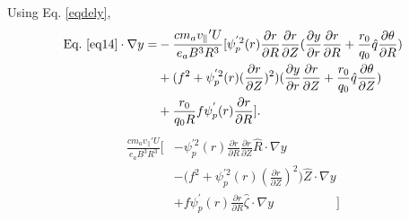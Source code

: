 \documentclass[12pt]{article}
\begin{document}
\begin{CJK*}{UTF8}{gbsn}
Using Eq. \ref{eqdely},
\begin{equation}
\begin{split}
    \textrm{Eq.}\ \ref{eq14} \cdot\nabla y =& -\frac{cm_av_{\parallel}{'}U}{e_aB^3R^3}[\psi_p^{'2}(r)\frac{\partial r}{\partial R}\frac{\partial r}{\partial Z}
    (\frac{\partial y}{\partial r}\frac{\partial r}{\partial R} + \frac{r_0}{q_0}\hat{q}\frac{\partial \theta}{\partial R})\\
    &+ (f^2 + \psi_p^{'2}(r)(\frac{\partial r}{\partial Z})^2)(\frac{\partial y}{\partial r}\frac{\partial r}{\partial Z} + 
    \frac{r_0}{q_0}\hat{q}\frac{\partial \theta}{\partial Z})\\
    &+ \frac{r_0}{q_0R}f\psi_p^{'}(r)\frac{\partial r}{\partial R}].
\end{split}
\end{equation}
{\color{blue}
\begin{equation*}
    \begin{split}
        \frac{cm_av_{\parallel}{'}U}{e_aB^3R^3}\bigg[&-\psi_p^{'2}(r)\frac{\partial r}{\partial R}\frac{\partial r}{\partial Z}
        \hat{R}\cdot\nabla y\\
        &- \bigg(f^2 + \psi_p^{'2}(r)(\frac{\partial r}{\partial Z})^2\bigg)\hat{Z}\cdot\nabla y\\
        &+ f\psi_p^{'}(r)\frac{\partial r}{\partial R}\hat{\zeta}\cdot\nabla y\qquad\qquad\quad\bigg]
    \end{split}
\end{equation*}
}

\newpage

\end{CJK*}
\end{document}
